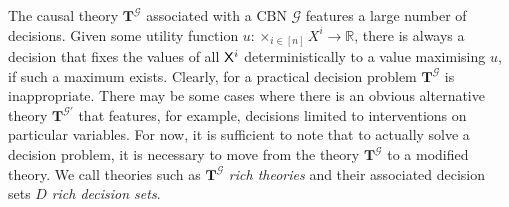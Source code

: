 The causal theory $\mathbf{T}^\mathcal{G}$ associated with a CBN $\mathcal{G}$ features a large number of decisions. Given some utility function $u:\times_{i\in [n]} X^i\to \mathbb{R}$, there is always a decision that fixes the values of all $\mathsf{X}^i$ deterministically to a value maximising $u$, if such a maximum exists. Clearly, for a practical decision problem $\mathbf{T}^\mathcal{G}$ is inappropriate. There may be some cases where there is an obvious alternative theory $\mathbf{T}^\mathcal{G\prime}$ that features, for example, decisions limited to interventions on particular variables. For now, it is sufficient to note that to actually solve a decision problem, it is necessary to move from the theory $\mathbf{T}^\mathcal{G}$ to a modified theory. We call theories such as $\mathbf{T}^\mathcal{G}$ \emph{rich theories} and their associated decision sets $D$ \emph{rich decision sets}.